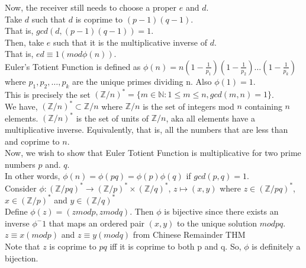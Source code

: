 \documentclass{article}
\begin{document}
Now, the receiver still needs to choose a proper $e$ and $d$. \\

Take $d$ such that $d$ is coprime to $(p-1)(q-1)$. \\

That is, $gcd(d,(p-1)(q-1)) = 1$.  \\

Then, take $e$ such that it is the multiplicative inverse of $d$. \\

That is, $ed \equiv 1 (mod\phi(n))$. \\

Euler's Totient Function is defined as $\phi(n) = n(1- \frac{1}{p_1})(1- \frac{1}{p_2})\ldots(1- \frac{1}{p_k})$ where $p_1, p_2,\ldots, p_k$ are the unique primes dividing n. Also $\phi(1)=1$. \\

This is precisely the set $(\mathbb{Z}/n)^* = \{ m \in \mathbb{N}: 1 \leq m \leq n, gcd(m,n) =1 \}$. \\

We have, $(\mathbb{Z}/n)^* \subset \mathbb{Z}/n$ where $\mathbb{Z}/n$ is the set of integers mod $n$ containing $n$ elements. $(\mathbb{Z}/n)^*$ is the set of units of $\mathbb{Z}/n$, aka all elements have a multiplicative inverse. Equivalently, that is, all the numbers that are less than and coprime to $n$. \\

Now, we wish to show that Euler Totient Function is multiplicative for two prime numbers $p$ and. $q$. \\

In other words, $\phi(n) = \phi(pq) = \phi(p)\phi(q)$ if $gcd(p,q) = 1$. \\

Consider $\phi:(\mathbb{Z}/pq)^* \rightarrow (\mathbb{Z}/p)^* \times (\mathbb{Z}/q)^*$, $z \mapsto (x,y)$ where $z \in (\mathbb{Z}/pq)^*$, $x \in (\mathbb{Z}/p)^*$ and $y \in (\mathbb{Z}/q)^*$\\

Define $\phi(z) = (z mod p, z mod q)$. Then $\phi$ is bijective since there exists an inverse $\phi^-1$ that maps an ordered pair $(x,y)$ to the unique solution $mod pq$. \\

$z \equiv x (mod p)$ and $z \equiv y (mod q)$ from Chinese Remainder THM \\

Note that $z$ is coprime to $pq$ iff it is coprime to both p and q. So, $\phi$ is definitely a bijection. \\
\end{document}
